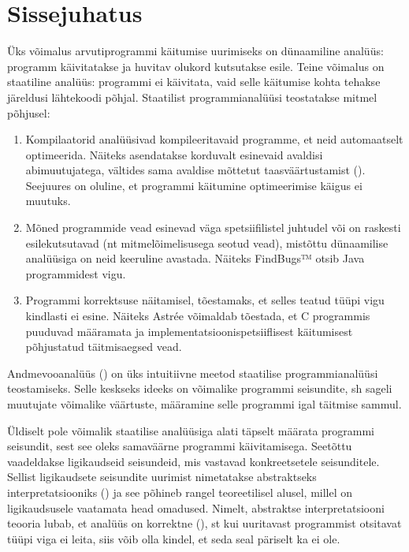 \documentclass[../thesis.tex]{subfiles}
\begin{document}
\section{Sissejuhatus}

Üks võimalus arvutiprogrammi käitumise uurimiseks on dünaamiline analüüs: programm käivitatakse ja huvitav olukord kutsutakse esile. Teine võimalus on staatiline analüüs: programmi ei käivitata, vaid selle käitumise kohta tehakse järeldusi lähtekoodi põhjal. Staatilist programmianalüüsi teostatakse mitmel põhjusel:
\begin{enumerate}
	\item Kompilaatorid analüüsivad kompileeritavaid programme, et neid automaatselt optimeerida. Näiteks asendatakse korduvalt esinevaid avaldisi abimuutujatega, vältides sama avaldise mõttetut taasväärtustamist (). Seejuures on oluline, et programmi käitumine optimeerimise käigus ei muutuks. 

	\item Mõned programmide vead esinevad väga spetsiifilistel juhtudel või on raskesti esilekutsutavad (nt mitmelõimelisusega seotud vead), mistõttu dünaamilise analüüsiga on neid keeruline avastada. Näiteks FindBugs™ otsib Java programmidest vigu.

	\item Programmi korrektsuse näitamisel, tõestamaks, et selles teatud tüüpi vigu kindlasti ei esine. Näiteks Astrée võimaldab tõestada, et C programmis puuduvad määramata ja implementatsioonispetsiiflisest käitumisest põhjustatud täitmisaegsed vead.
\end{enumerate}

Andmevooanalüüs () on üks intuitiivne meetod staatilise programmianalüüsi teostamiseks. Selle keskseks ideeks on võimalike programmi seisundite, sh sageli muutujate võimalike väärtuste, määramine selle programmi igal täitmise sammul.

Üldiselt pole võimalik staatilise analüüsiga alati täpselt määrata programmi seisundit, sest see oleks samaväärne programmi käivitamisega. Seetõttu vaadeldakse ligikaudseid seisundeid, mis vastavad konkreetsetele seisunditele. Sellist ligikaudsete seisundite uurimist nimetatakse abstraktseks interpretatsiooniks () ja see põhineb rangel teoreetilisel alusel, millel on ligikaudsusele vaatamata head omadused. Nimelt, abstraktse interpretatsiooni teooria lubab, et analüüs on korrektne (), st kui uuritavast programmist otsitavat tüüpi viga ei leita, siis võib olla kindel, et seda seal päriselt ka ei ole.
\end{document}
